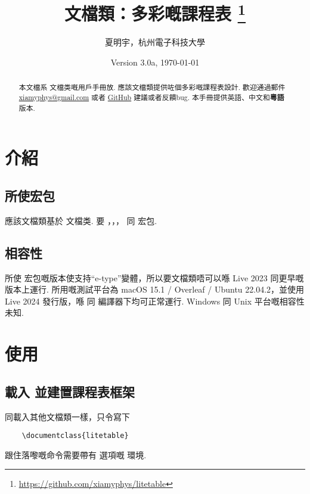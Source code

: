 \documentclass[letterpaper]{l3doc}
\title{
    \cls{litetable} 文檔類：多彩嘅課程表
    \thanks{\url{https://github.com/xiamyphys/litetable}}
}
\author{夏明宇，杭州電子科技大學}
\affil{\href{mailto:xiamyphys@gmail.com}{xiamyphys@gmail.com}}
\date{Version 3.0a, \today}
\begin{document}
\maketitle

\begin{abstract}
    本文檔系  文檔类嘅用戶手冊放. 應該文檔類提供咗個多彩嘅課程表設計. 歡迎通過郵件 \href{mailto:xiamyphys@gmail.com}{xiamyphys@gmail.com} 或者 \href{https://github.com/xiamyphys/litetable/issues}{GitHub} 建議或者反饋bug. 本手冊提供英語、中文和\textbf{粵語}版本.
\end{abstract}

\section{介紹}

\subsection{所使宏包}

應該文檔類基於  文檔类. 要 ，，， 同  宏包. 

\subsection{相容性}

所使  宏包嘅版本使支持``e-type''變體，所以要文檔類唔可以喺 Live 2023 同更早嘅版本上運行. 所用嘅測試平台為 macOS 15.1 / Overleaf / Ubuntu 22.04.2，並使用 Live 2024 發行版，喺  同  編譯器下均可正常運行. Windows 同 Unix 平台嘅相容性未知.

\section{使用}

\subsection{載入  並建置課程表框架}

同載入其他文檔類一樣，只令寫下

\begin{Verbatim}
    \documentclass{litetable}
\end{Verbatim}

跟住落嚟嘅命令需要帶有  選項嘅  環境.
\end{document}
